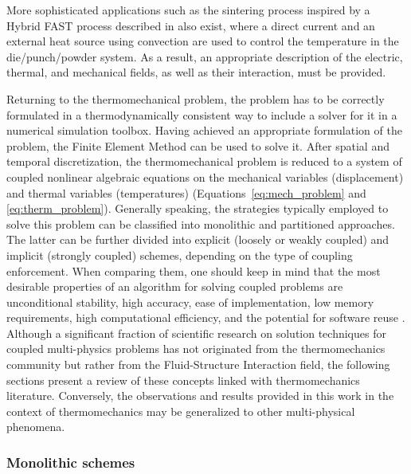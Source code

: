 More sophisticated applications such as the sintering process inspired by a Hybrid FAST process described in \cite{rotheAnalyticalNumericalTreatment2014} also exist, where a direct current and an external heat source using convection are used to control the temperature in the die/punch/powder system.
As a result, an appropriate description of the electric, thermal, and mechanical fields, as well as their interaction, must be provided.

Returning to the thermomechanical problem, the problem has to be correctly formulated in a thermodynamically consistent way to include a solver for it in a numerical simulation toolbox.
Having achieved an appropriate formulation of the problem, the Finite Element Method can be used to solve it.
After spatial and temporal discretization, the thermomechanical problem is reduced to a system of coupled nonlinear algebraic equations on the mechanical variables (displacement) and thermal variables (temperatures) (Equations~\eqref{eq:mech_problem} and \eqref{eq:therm_problem}).
Generally speaking, the strategies typically employed to solve this problem can be classified into monolithic and partitioned approaches.
The latter can be further divided into explicit (loosely or weakly coupled) and implicit (strongly coupled) schemes, depending on the type of coupling enforcement.
When comparing them, one should keep in mind that the most desirable properties of an algorithm for solving coupled problems are unconditional stability, high accuracy, ease of implementation, low memory requirements, high computational efficiency, and the potential for software reuse \citep{fellipa_partitioned_1988}.
Although a significant fraction of scientific research on solution techniques for coupled multi-physics problems has not originated from the thermomechanics community but rather from the Fluid-Structure Interaction field, the following sections present a review of these concepts linked with thermomechanics literature.
Conversely, the observations and results provided in this work in the context of thermomechanics may be generalized to other multi-physical phenomena.

\subsubsection{Monolithic schemes}
\label{sec:monolithic-schemes}

